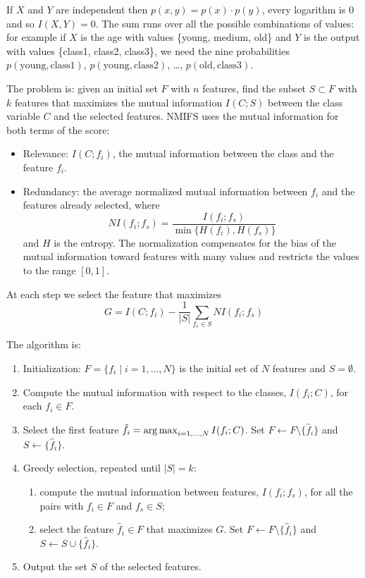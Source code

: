 If $X$ and $Y$ are independent then $p(x,y)=p(x)\cdot p(y)$, every logarithm is 0 and so $I(X,Y)=0$. The sum runs over all the possible combinations of values: for example if $X$ is the age with values \{young, medium, old\} and $Y$ is the output with values \{class1, class2, class3\}, we need the nine probabilities $p(\text{young},\text{class1})$, $p(\text{young},\text{class2})$, \dots, $p(\text{old},\text{class3})$.

The problem is: given an initial set $F$ with $n$ features, find the subset $S \subset F$ with $k$ features that maximizes the mutual information $I(C;S)$ between the class variable $C$ and the selected features. NMIFS uses the mutual information for both terms of the score:
\begin{itemize}
    \item Relevance: $I(C;f_i)$, the mutual information between the class and the feature $f_i$.
    \item Redundancy: the average normalized mutual information between $f_i$ and the features already selected, where
    \[
        NI(f_i;f_s) = \frac{I(f_i;f_s)}{\min\{H(f_i),H(f_s)\}}
    \]
    and $H$ is the entropy. The normalization compensates for the bias of the mutual information toward features with many values and restricts the values to the range $[0,1]$.
\end{itemize}
At each step we select the feature that maximizes
\[
    G = I(C;f_i) - \frac{1}{|S|}\sum_{f_s\in S} NI(f_i;f_s)
\]

The algorithm is:
\begin{enumerate}
    \item Initialization: $F=\{f_i \mid i=1,\dots,N\}$ is the initial set of $N$ features and $S=\emptyset$.
    \item Compute the mutual information with respect to the classes, $I(f_i;C)$, for each $f_i\in F$.
    \item Select the first feature $\hat{f}_i = \operatorname*{arg\,max}_{i=1,\dots,N} I(f_i;C)$. Set $F \leftarrow F\setminus\{\hat{f}_i\}$ and $S \leftarrow \{\hat{f}_i\}$.
    \item Greedy selection, repeated until $|S|=k$:
    \begin{enumerate}
        \item compute the mutual information between features, $I(f_i;f_s)$, for all the pairs with $f_i\in F$ and $f_s\in S$;
        \item select the feature $\hat{f}_i\in F$ that maximizes $G$. Set $F \leftarrow F\setminus\{\hat{f}_i\}$ and $S \leftarrow S\cup\{\hat{f}_i\}$.
    \end{enumerate}
    \item Output the set $S$ of the selected features.
\end{enumerate}


